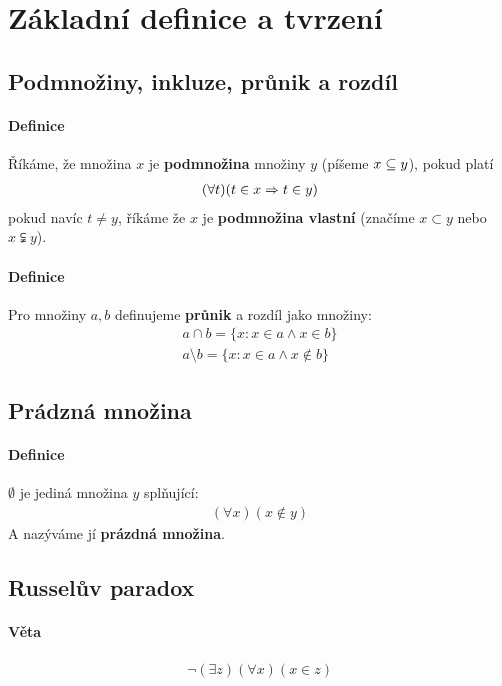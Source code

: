 \documentclass[a4paper,12pt,titlepage]{article}
\begin{document}
\section{Základní definice a tvrzení}
\setcounter{equation}{0}
\subsection{Podmnožiny, inkluze, průnik a rozdíl}
\setcounter{equation}{0}
\paragraph{Definice}
Říkáme, že množina $x$ je \textbf{podmnožina} množiny $y$ (píšeme $x \subseteq 
y$), pokud platí
\begin{align}
	(\forall t) (t \in x \Rightarrow t \in y)
\end{align}
pokud navíc $t \neq y$, říkáme že $x$ je \textbf{podmnožina vlastní} (značíme $x 
\subset y$ nebo $x \subsetneqq y$).
\paragraph{Definice}
Pro množiny $a, b$ definujeme \textbf{průnik} a rozdíl jako množiny:
\begin{align}
	a \cap b = \{x : x \in a \land x \in b\}\\
	a \setminus b = \{x : x \in a \land x \nin b\}
\end{align}
\subsection{Prádzná množina}
\setcounter{equation}{0}
\paragraph{Definice}
$\emptyset$ je jediná množina $y$ splňující:
\begin{align}
	(\forall x) (x \nin y)
\end{align}
A nazýváme jí \textbf{prázdná množina}.
\subsection{Russelův paradox}
\setcounter{equation}{0}
\paragraph{Věta}
\begin{align}
	\neg ( \exists z) (\forall x) (x \in z)
\end{align}
\end{document}
